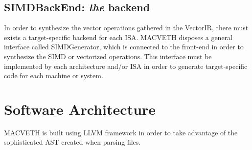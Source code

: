 \documentclass[a4paper,12pt]{memoir}
\begin{document}
\section{SIMDBackEnd: \textit{the} backend}
In order to synthesize the vector operations gathered in the VectorIR, there
must exists a target-specific backend for each ISA. MACVETH disposes a general
interface called SIMDGenerator, which is connected to the front-end in order to
synthesize the SIMD or vectorized operations. This interface must be
implemented by each architecture and/or ISA in order to generate
target-specific code for each machine or system.



\newpage
\chapter{Software Architecture}
MACVETH is built using LLVM framework in order to take advantage of the
sophisticated AST created when parsing files.



\end{document}
